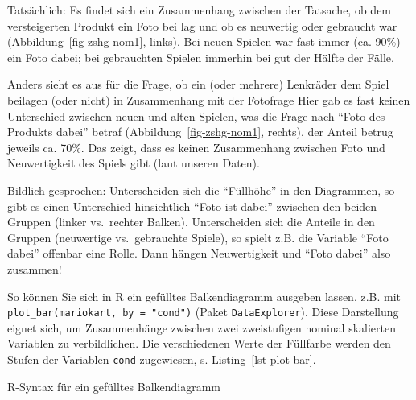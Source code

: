 \documentclass[
  letterpaper,
  oneside,
  open=any]{scrbook}
\newenvironment{Shaded}{\begin{snugshade}}{\end{snugshade}}
\newcommand{\AttributeTok}[1]{\textcolor[rgb]{0.40,0.45,0.13}{#1}}
\newcommand{\CommentTok}[1]{\textcolor[rgb]{0.37,0.37,0.37}{#1}}
\newcommand{\FunctionTok}[1]{\textcolor[rgb]{0.28,0.35,0.67}{#1}}
\newcommand{\NormalTok}[1]{\textcolor[rgb]{0.00,0.23,0.31}{#1}}
\newcommand{\SpecialCharTok}[1]{\textcolor[rgb]{0.37,0.37,0.37}{#1}}
\newcommand{\StringTok}[1]{\textcolor[rgb]{0.13,0.47,0.30}{#1}}
\theoremstyle{definition}
\theoremstyle{definition}
\theoremstyle{definition}
\theoremstyle{remark}
\begin{document}
Tatsächlich: Es findet sich ein Zusammenhang zwischen der Tatsache, ob
dem versteigerten Produkt ein Foto bei lag und ob es neuwertig oder
gebraucht war (Abbildung~\ref{fig-zshg-nom1}, links). Bei neuen Spielen
war fast immer (ca. 90\%) ein Foto dabei; bei gebrauchten Spielen
immerhin bei gut der Hälfte der Fälle.

Anders sieht es aus für die Frage, ob ein (oder mehrere) Lenkräder dem
Spiel beilagen (oder nicht) in Zusammenhang mit der Fotofrage Hier gab
es fast keinen Unterschied zwischen neuen und alten Spielen, was die
Frage nach \enquote{Foto des Produkts dabei} betraf
(Abbildung~\ref{fig-zshg-nom1}, rechts), der Anteil betrug jeweils ca.
70\%. Das zeigt, dass es keinen Zusammenhang zwischen Foto und
Neuwertigkeit des Spiels gibt (laut unseren Daten).

Bildlich gesprochen: Unterscheiden sich die \enquote{Füllhöhe} in den
Diagrammen, so gibt es einen Unterschied hinsichtlich \enquote{Foto ist
dabei} zwischen den beiden Gruppen (linker vs.~rechter Balken).
Unterscheiden sich die Anteile in den Gruppen (neuwertige vs.~gebrauchte
Spiele), so spielt z.B. die Variable \enquote{Foto dabei} offenbar eine
Rolle. Dann hängen Neuwertigkeit und \enquote{Foto dabei} also zusammen!

So können Sie sich in R ein gefülltes Balkendiagramm ausgeben lassen,
z.B. mit \texttt{plot\_bar(mariokart,\ by\ =\ "cond")} (Paket
\texttt{DataExplorer}). Diese Darstellung eignet sich, um Zusammenhänge
zwischen zwei zweistufigen nominal skalierten Variablen zu
verbildlichen. Die verschiedenen Werte der Füllfarbe werden den Stufen
der Variablen \texttt{cond} zugewiesen, s. Listing~\ref{lst-plot-bar}.

\begin{codelisting}

\caption{\label{lst-plot-bar}R-Syntax für ein gefülltes Balkendiagramm}

\centering{

\begin{Shaded}
\begin{Highlighting}[]
\NormalTok{mariokart }\SpecialCharTok{\%\textgreater{}\%} 
  \FunctionTok{select}\NormalTok{(cond, stock\_photo) }\SpecialCharTok{\%\textgreater{}\%} 
  \FunctionTok{plot\_bar}\NormalTok{(}\AttributeTok{by =} \StringTok{"cond"}\NormalTok{)  }\CommentTok{\# aus dem Paket DataExplorer}
\end{Highlighting}
\end{Shaded}

}

\end{codelisting}%
\end{document}
